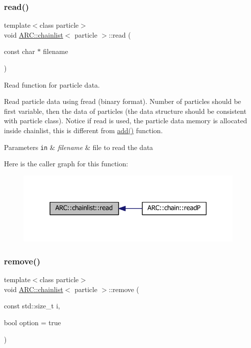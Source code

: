 \subsubsection{\texorpdfstring{read()}{read()}}
{\footnotesize\ttfamily template$<$class particle$>$ \\
void \hyperlink{classARC_1_1chainlist}{A\+R\+C\+::chainlist}$<$ particle $>$\+::read (\begin{DoxyParamCaption}\item[{const char $\ast$}]{filename }\end{DoxyParamCaption})\hspace{0.3cm}{\ttfamily [inline]}}



Read function for particle data. 

Read particle data using fread (binary format). Number of particles should be first variable, then the data of particles (the data structure should be consistent with particle class). Notice if read is used, the particle data memory is allocated inside chainlist, this is different from \hyperlink{classARC_1_1chainlist_afa780edfa301cc22cf189e63d7a59c2c}{add()} function. 
\begin{DoxyParams}[1]{Parameters}
\mbox{\tt in}  & {\em filename} & file to read the data \\
\hline
\end{DoxyParams}
Here is the caller graph for this function\+:
\nopagebreak
\begin{figure}[H]
\begin{center}
\leavevmode
\includegraphics[width=317pt]{classARC_1_1chainlist_aea5f83e036a5e4649158f13cf341a31e_icgraph}
\end{center}
\end{figure}
\hypertarget{classARC_1_1chainlist_acfd8eb70053894bd0883a77d6c111932}{}\label{classARC_1_1chainlist_acfd8eb70053894bd0883a77d6c111932} 
\subsubsection{\texorpdfstring{remove()}{remove()}}
{\footnotesize\ttfamily template$<$class particle$>$ \\
void \hyperlink{classARC_1_1chainlist}{A\+R\+C\+::chainlist}$<$ particle $>$\+::remove (\begin{DoxyParamCaption}\item[{const std\+::size\+\_\+t}]{i,  }\item[{bool}]{option = {\ttfamily true} }\end{DoxyParamCaption})\hspace{0.3cm}{\ttfamily [inline]}}



